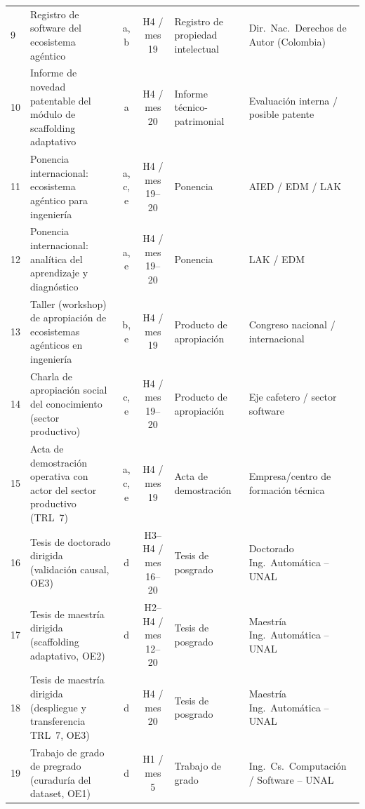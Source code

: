 \begin{table}[h]
\begin{tabularx}{\textwidth}{@{}l X c c l X@{}}
\addlinespace
9 & Registro de software del ecosistema agéntico
  & a, b & H4 / mes 19 & Registro de propiedad intelectual
  & Dir.\ Nac.\ Derechos de Autor (Colombia) \\

10 & Informe de novedad patentable del módulo de scaffolding adaptativo
  & a & H4 / mes 20 & Informe técnico-patrimonial
  & Evaluación interna / posible patente \\

\addlinespace
11 & Ponencia internacional: ecosistema agéntico para ingeniería
  & a, c, e & H4 / mes 19--20 & Ponencia
  & AIED / EDM / LAK \\

12 & Ponencia internacional: analítica del aprendizaje y diagnóstico
  & a, e & H4 / mes 19--20 & Ponencia
  & LAK / EDM \\

13 & Taller (workshop) de apropiación de ecosistemas agénticos en ingeniería
  & b, e & H4 / mes 19 & Producto de apropiación
  & Congreso nacional / internacional \\

14 & Charla de apropiación social del conocimiento (sector productivo)
  & c, e & H4 / mes 19--20 & Producto de apropiación
  & Eje cafetero / sector software \\

15 & Acta de demostración operativa con actor del sector productivo (TRL~7)
  & a, c, e & H4 / mes 19 & Acta de demostración
  & Empresa/centro de formación técnica \\

\addlinespace
16 & Tesis de doctorado dirigida (validación causal, OE3)
  & d & H3--H4 / mes 16--20 & Tesis de posgrado
  & Doctorado Ing.\ Automática -- UNAL \\

17 & Tesis de maestría dirigida (scaffolding adaptativo, OE2)
  & d & H2--H4 / mes 12--20 & Tesis de posgrado
  & Maestría Ing.\ Automática -- UNAL \\

18 & Tesis de maestría dirigida (despliegue y transferencia TRL~7, OE3)
  & d & H4 / mes 20 & Tesis de posgrado
  & Maestría Ing.\ Automática -- UNAL \\

19 & Trabajo de grado de pregrado (curaduría del dataset, OE1)
  & d & H1 / mes 5 & Trabajo de grado
  & Ing.\ Cs.\ Computación / Software -- UNAL \\


\end{tabularx}
\end{table}
